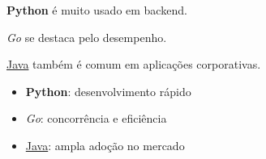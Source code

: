 \documentclass{article}
\begin{document}
\textbf{Python} é muito usado em backend.

\textit{Go} se destaca pelo desempenho.

\underline{Java} também é comum em aplicações corporativas.


\begin{itemize}

    \item \textbf{Python}: desenvolvimento rápido

    \item \textit{Go}: concorrência e eficiência

    \item \underline{Java}: ampla adoção no mercado

\end{itemize}
\end{document}
